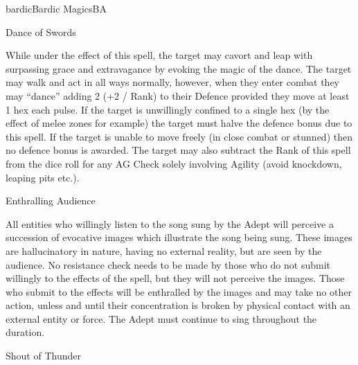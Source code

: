 \begin{college}[2.1]{bardic}{Bardic Magics}{BA}
\begin{spell}[S-5]{Dance of Swords}
\begin{effects}
While under the effect of this spell, the target may cavort and leap
with surpassing grace and extravagance by evoking the magic of the
dance. The target may walk and act in all ways normally, however, when
they enter combat they may ``dance'' adding 2 (+2 / Rank) to their
Defence provided they move at least 1 hex each pulse. If the target is
unwillingly confined to a single hex (by the effect of melee zones for
example) the target must halve the defence bonus due to this spell. If
the target is unable to move freely (in close combat or stunned) then
no defence bonus is awarded. The target may also subtract the Rank of
this spell from the dice roll for any AG Check solely involving
Agility (\eg avoid knockdown, leaping pits etc.).
\end{effects}
\end{spell}

\begin{spell}[S-6]{Enthralling Audience}

\begin{effects}
All entities who willingly listen to the song sung by the Adept will
perceive a succession of evocative images which illustrate the song
being sung. These images are hallucinatory in nature, having no
external reality, but are seen by the audience. No resistance check
needs to be made by those who do not submit willingly to the effects
of the spell, but they will not perceive the images.  Those who submit
to the effects will be enthralled by the images and may take no other
action, unless and until their concentration is broken by physical
contact with an external entity or force. The Adept must continue to
sing throughout the duration.
\end{effects}
\end{spell}

\begin{spell}[S-7]{Shout of Thunder}


\end{spell}
\end{college}
